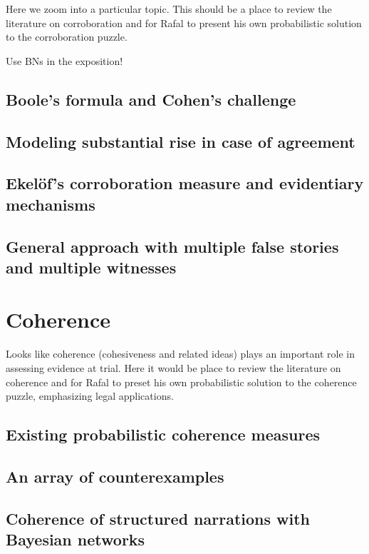 \documentclass[]{book}
\begin{document}
Here we zoom into a particular topic. This should be a
place to review the literature on corroboration and
for Rafal to present his own probabilistic solution
to the corroboration puzzle.

Use BNs in the exposition!

\section{Boole's formula and Cohen's challenge}

\section{Modeling substantial rise in case of agreement}

\section{Ekel\"of's corroboration measure and evidentiary mechanisms}

\section{General approach  with multiple false stories and multiple witnesses}

\chapter{Coherence}

Looks like coherence (cohesiveness and related ideas)
plays an important role in assessing evidence at trial.
Here it would be place to review the literature on coherence
and for Rafal to preset his
own probabilistic solution to the coherence puzzle,
emphasizing legal applications.

\section{Existing probabilistic coherence measures}

\section{An array of counterexamples}

\section{Coherence of structured narrations 
with Bayesian networks}
\end{document}
